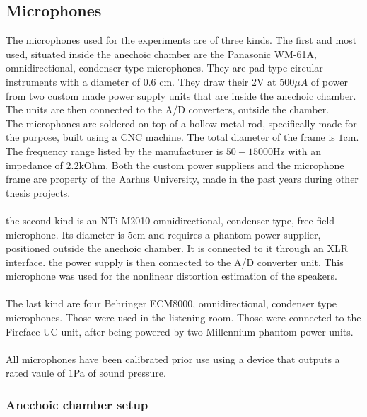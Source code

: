\subsection{Microphones}{}
\label{subsec:mics}

The microphones used for the experiments are of three kinds. The first and most used, situated inside the anechoic chamber are the Panasonic WM-61A, omnidirectional, condenser type microphones. They are pad-type circular instruments with a diameter of 0.6 cm. They draw their 2V at 500$\mu A$ of power from two custom made power supply units that are inside the anechoic chamber. The units are then connected to the A/D converters, outside the chamber.
\\
The microphones are soldered on top of a hollow metal rod, specifically made for the purpose, built using a CNC machine. The total diameter of the frame is $1$cm. The frequency range listed by the manufacturer is $50 - 15000$Hz with an impedance of $2.2$kOhm. Both the custom power suppliers and the microphone frame are property of the Aarhus University, made in the past years during other thesis projects.
\\
\\
the second kind is an NTi M2010 omnidirectional, condenser type, free field microphone. Its diameter is $5$cm and requires a phantom power supplier, positioned outside the anechoic chamber. It is connected to it through an XLR interface. the power supply is then connected to the A/D converter unit. This microphone was used for the nonlinear distortion estimation of the speakers.
\\
\\
The last kind are four Behringer ECM8000, omnidirectional, condenser type microphones. Those were used in the listening room. Those were connected to the Fireface UC unit, after being powered by two Millennium phantom power units.
\\
\\
All microphones have been calibrated prior use using a device that outputs a rated vaule of $1$Pa of sound pressure.

\subsubsection{Anechoic chamber setup}

